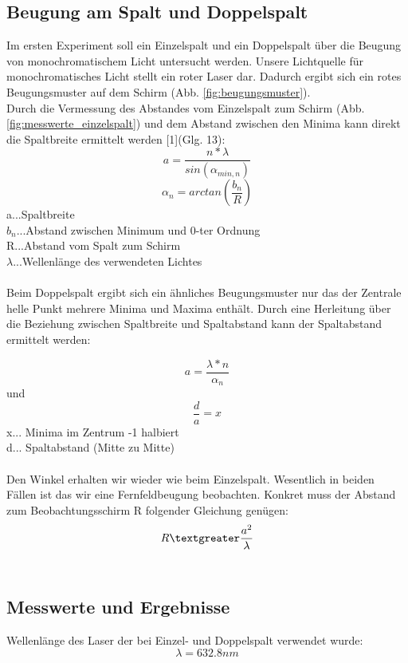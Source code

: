 \documentclass[12pt,a4paper]{article}
\begin{document}
\begin{multicols}{2}

\section{Beugung am Spalt und Doppelspalt}
Im ersten Experiment soll ein Einzelspalt und ein Doppelspalt über die Beugung von monochromatischem Licht untersucht werden. Unsere Lichtquelle für monochromatisches Licht stellt ein roter Laser dar. Dadurch ergibt sich ein rotes Beugungsmuster auf dem Schirm (Abb. \ref{fig:beugungsmuster}). 
\\
Durch die Vermessung des Abstandes vom Einzelspalt zum Schirm (Abb. \ref{fig:messwerte_einzelspalt}) und dem Abstand zwischen den Minima kann direkt die Spaltbreite ermittelt werden [1](Glg. 13):
$$a = \frac{n*\lambda}{sin(\alpha_{min,n})} $$
$$\alpha_n = arctan(\frac{b_n}{R})$$
a...Spaltbreite\\
$b_n$...Abstand zwischen Minimum und 0-ter Ordnung\\
R...Abstand vom Spalt zum Schirm\\
$\lambda$...Wellenlänge des verwendeten Lichtes\\
\\
Beim Doppelspalt ergibt sich ein ähnliches Beugungsmuster nur das der Zentrale helle Punkt mehrere Minima und Maxima enthält. Durch eine Herleitung über die Beziehung zwischen Spaltbreite und Spaltabstand kann der Spaltabstand ermittelt werden:

$$ a = \frac{\lambda * n}{\alpha_n} $$
und
$$\frac{d}{a} = x$$
\noindent
x... Minima im Zentrum -1 halbiert\\
d... Spaltabstand (Mitte zu Mitte)\\
\\
Den Winkel erhalten wir wieder wie beim Einzelspalt.
Wesentlich in beiden Fällen ist das wir eine Fernfeldbeugung beobachten. Konkret muss der Abstand zum Beobachtungsschirm R folgender Gleichung genügen:
$$R \textgreater \frac{a^2}{\lambda}$$
\\
%

\subsection{Messwerte und Ergebnisse}

Wellenlänge des Laser der bei Einzel- und Doppelspalt verwendet wurde:
$$\lambda = 632.8nm$$

\end{multicols}
\end{document}
